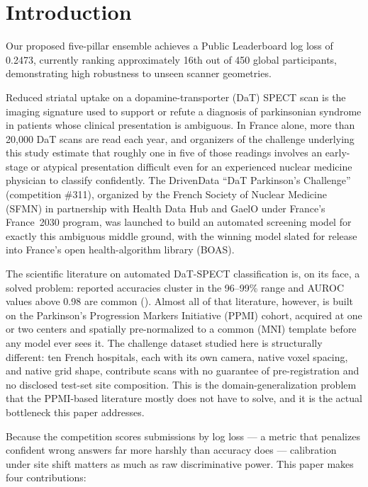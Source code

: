 \documentclass[10pt]{article}
\begin{document}
\section{Introduction}

Our proposed five-pillar ensemble achieves a Public Leaderboard log loss of 0.2473, currently ranking approximately 16th out of 450 global participants, demonstrating high robustness to unseen scanner geometries.
\label{sec:intro}

Reduced striatal uptake on a dopamine-transporter (DaT) SPECT scan is the imaging signature used to support or refute a diagnosis of parkinsonian syndrome in patients whose clinical presentation is ambiguous. In France alone, more than 20{,}000 DaT scans are read each year, and organizers of the challenge underlying this study estimate that roughly one in five of those readings involves an early-stage or atypical presentation difficult even for an experienced nuclear medicine physician to classify confidently. The DrivenData ``DaT Parkinson's Challenge'' (competition \#311), organized by the French Society of Nuclear Medicine (SFMN) in partnership with Health Data Hub and GaelO under France's France~2030 program, was launched to build an automated screening model for exactly this ambiguous middle ground, with the winning model slated for release into France's open health-algorithm library (BOAS).

The scientific literature on automated DaT-SPECT classification is, on its face, a solved problem: reported accuracies cluster in the 96--99\% range and AUROC values above 0.98 are common (). Almost all of that literature, however, is built on the Parkinson's Progression Markers Initiative (PPMI) cohort, acquired at one or two centers and spatially pre-normalized to a common (MNI) template before any model ever sees it. The challenge dataset studied here is structurally different: ten French hospitals, each with its own camera, native voxel spacing, and native grid shape, contribute scans with no guarantee of pre-registration and no disclosed test-set site composition. This is the domain-generalization problem that the PPMI-based literature mostly does not have to solve, and it is the actual bottleneck this paper addresses.

Because the competition scores submissions by log loss --- a metric that penalizes confident wrong answers far more harshly than accuracy does --- calibration under site shift matters as much as raw discriminative power. This paper makes four contributions:
\end{document}
